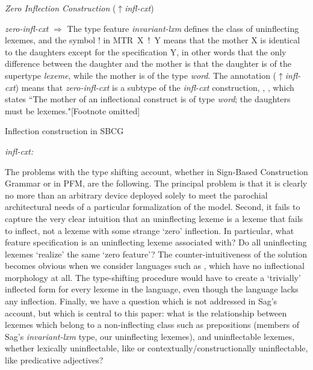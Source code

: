 \documentclass[output=paper,colorlinks,citecolor=brown]{langscibook}
\begin{document}
\ea\label{zeroinflcxt}
\textit{Zero Inflection Construction} ($\uparrow$\textit{infl-cxt})

\textit{zero-infl-cxt}	$\Rightarrow$
\z
The  type feature  \textit{invariant-lxm} defines the class of uninflecting lexemes, and the symbol ! in  \mbox{MTR X ! Y} means that the mother X is identical to the daughters except for the specification Y, in other words that the only difference between the daughter and the mother is that the daughter is of the supertype \textit{lexeme}, while the mother is of the type \textit{word}. The annotation ($\uparrow$\textit{infl-cxt}) means that \textit{zero-infl-cxt} is a subtype of the \textit{infl-cxt} construction, , \citep[Sag's (57)][108]{sag2012}, which states ``The mother of an inflectional construct is of type \emph{word}; the daughters must be lexemes."[Footnote omitted]


\ea\label{infl-cxt}
Inflection construction in SBCG

\textit{infl-cxt:}	
\z

The problems with the type shifting account, whether in Sign-Based Construction Grammar or in PFM, are the following.  %
The principal problem is that it is clearly no more than an arbitrary device deployed solely to meet the parochial architectural needs of a particular formalization of the model. %
Second, it fails to capture the very clear intuition that an uninflecting lexeme is a lexeme that fails to inflect, not a lexeme with some strange `zero' inflection. In particular, what feature specification is an uninflecting lexeme associated with? Do all uninflecting lexemes `realize' the same `zero feature'? %
The counter-intuitiveness of the solution becomes obvious when we consider languages such as , which have no inflectional morphology at all. The type-shifting procedure would have to create a `trivially' inflected form for every lexeme in the language, even though the language lacks any inflection. Finally, we have a question which is not addressed in Sag's account, but which is central to this paper: what is the relationship between lexemes which belong to a non-inflecting class such as  prepositions (members of Sag's \textit{invariant-lxm} type, our uninflecting lexemes), and uninflectable lexemes, whether lexically uninflectable, like  or contextually/constructionally uninflectable, like  predicative adjectives?
\end{document}
